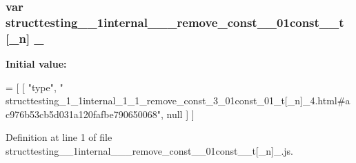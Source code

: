 \subsubsection[{\texorpdfstring{\+\_\+4}{_4}}]{\setlength{\rightskip}{0pt plus 5cm}var structtesting\+\_\+\_\+1internal\+\_\+\_\+\_\+remove\+\_\+const\+\_\+\_\+01const\+\_\+\_\+t \mbox{[}\+\_\+n\mbox{]} \+\_}\hypertarget{structtesting__1__1internal__1__1__remove__const__3__01const__01__t[__n]__4_8js_a5119dc1880736c7b62cdac31b0dce651}{}\label{structtesting__1__1internal__1__1__remove__const__3__01const__01__t[__n]__4_8js_a5119dc1880736c7b62cdac31b0dce651}
{\bfseries Initial value\+:}
\begin{DoxyCode}
=
[
    [ \textcolor{stringliteral}{"type"}, \textcolor{stringliteral}{"
      structtesting\_1\_1internal\_1\_1\_remove\_const\_3\_01const\_01\_t[\_n]\_4.html#ac976b53cb5d031a120fafbe790650068"}, null ]
]
\end{DoxyCode}


Definition at line 1 of file structtesting\+\_\+\_\+1internal\+\_\+\_\+\_\+remove\+\_\+const\+\_\+\_\+01const\+\_\+\_\+t\mbox{[}\+\_\+n\mbox{]}\+\_.\+js.

